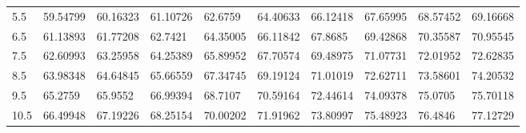 \documentclass[10pt,twocolumn,letterpaper]{article}
\begin{document}
\begin{table}
\begin{tabular}{llllllllll}
    5.5             & 59.54799                               & 60.16323                               & 61.10726                                & 62.6759                                 & 64.40633                                & 66.12418                                & 67.65995                                & 68.57452                                & 69.16668                                \\
    6.5             & 61.13893                               & 61.77208                               & 62.7421                                 & 64.35005                                & 66.11842                                & 67.8685                                 & 69.42868                                & 70.35587                                & 70.95545                                \\
    7.5             & 62.60993                               & 63.25958                               & 64.25389                                & 65.89952                                & 67.70574                                & 69.48975                                & 71.07731                                & 72.01952                                & 72.62835                                \\
    8.5             & 63.98348                               & 64.64845                               & 65.66559                                & 67.34745                                & 69.19124                                & 71.01019                                & 72.62711                                & 73.58601                                & 74.20532                                \\
    9.5             & 65.2759                                & 65.9552                                & 66.99394                                & 68.7107                                 & 70.59164                                & 72.44614                                & 74.09378                                & 75.0705                                 & 75.70118                                \\
    10.5            & 66.49948                               & 67.19226                               & 68.25154                                & 70.00202                                & 71.91962                                & 73.80997                                & 75.48923                                & 76.4846                                 & 77.12729                                \\

\end{tabular}
\end{table}
\end{document}
